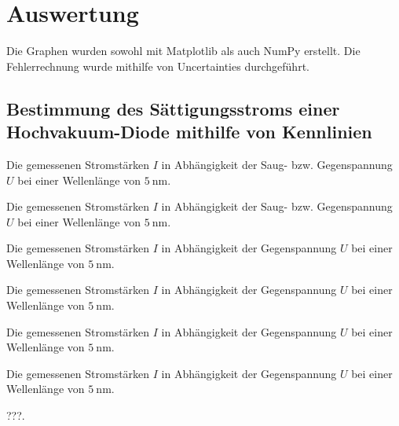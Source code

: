 \section{Auswertung}
\label{sec:Auswertung}

Die Graphen wurden sowohl mit Matplotlib \cite{matplotlib} als auch NumPy \cite{numpy} erstellt. Die
 Fehlerrechnung wurde mithilfe von Uncertainties \cite{uncertainties} durchgeführt. 


\subsection{Bestimmung des Sättigungsstroms einer Hochvakuum-Diode mithilfe von Kennlinien}
\begin{center}
	\begin{table}
		\caption{Die gemessenen Stromstärken $I$ in Abhängigkeit der Saug- bzw. Gegenspannung $U$ bei einer Wellenlänge von $\SI{5}{\nano\meter}$.}
		
			\centering
			
		
		
			
		
	\end{table}
\end{center}
\begin{table}
	\centering
	\caption{Die gemessenen Stromstärken $I$ in Abhängigkeit der Saug- bzw. Gegenspannung $U$ bei einer Wellenlänge von $\SI{5}{\nano\meter}$.}
	
\end{table}
\begin{table}
	\centering
	\caption{Die gemessenen Stromstärken $I$ in Abhängigkeit der Gegenspannung $U$ bei einer Wellenlänge von $\SI{5}{\nano\meter}$.}
	
\end{table}
\begin{table}
	\centering
	\caption{Die gemessenen Stromstärken $I$ in Abhängigkeit der Gegenspannung $U$ bei einer Wellenlänge von $\SI{5}{\nano\meter}$.}
	
\end{table}
\begin{table}
	\centering
	\caption{Die gemessenen Stromstärken $I$ in Abhängigkeit der Gegenspannung $U$ bei einer Wellenlänge von $\SI{5}{\nano\meter}$.}
	
\end{table}
\begin{table}
	\centering
	\caption{Die gemessenen Stromstärken $I$ in Abhängigkeit der Gegenspannung $U$ bei einer Wellenlänge von $\SI{5}{\nano\meter}$.}
	
\end{table}
\begin{table}
	\centering
	\caption{???.}
  	
\end{table}

